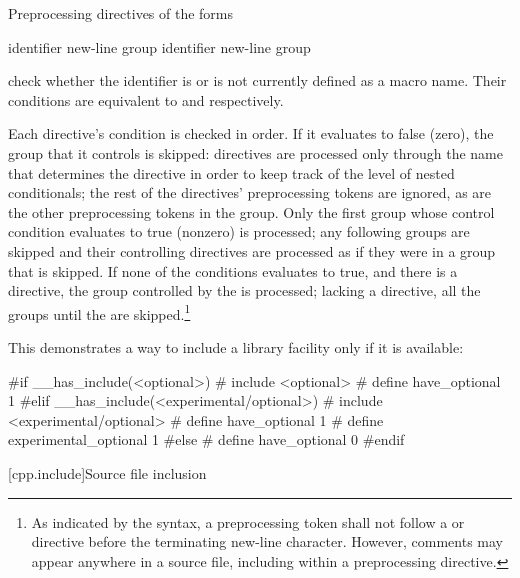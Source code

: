 \pnum
Preprocessing directives of the forms

\begin{ncbnftab}
\>\>identifier new-line group\opt\br
{}%
\>\>identifier new-line group\opt
{}%
\end{ncbnftab}

check whether the identifier is or is not currently defined as a macro name.
Their conditions are equivalent to
and
respectively.

\pnum
Each directive's condition is checked in order.
If it evaluates to false (zero),
the group that it controls is skipped:
directives are processed only through the name that determines
the directive in order to keep track of the level
of nested conditionals;
the rest of the directives' preprocessing tokens are ignored,
as are the other preprocessing tokens in the group.
Only the first group
whose control condition evaluates to true (nonzero) is processed;
any following groups are skipped and their controlling directives
are processed as if they were in a group that is skipped.
If none of the conditions evaluates to true,
and there is a
%
directive,
the group controlled by the
is processed; lacking a
directive, all the groups until the
%
are skipped.\footnote{As indicated by the syntax,
a preprocessing token shall not follow a
or
directive before the terminating new-line character.
However,
comments may appear anywhere in a source file,
including within a preprocessing directive.}

\enterexample
This demonstrates a way to include a library  facility
only if it is available:

\begin{codeblock}
#if __has_include(<optional>)
#  include <optional>
#  define have_optional 1
#elif __has_include(<experimental/optional>)
#  include <experimental/optional>
#  define have_optional 1
#  define experimental_optional 1
#else
#  define have_optional 0
#endif
\end{codeblock}
\exitexample

[cpp.include]{Source file inclusion}
%
%

